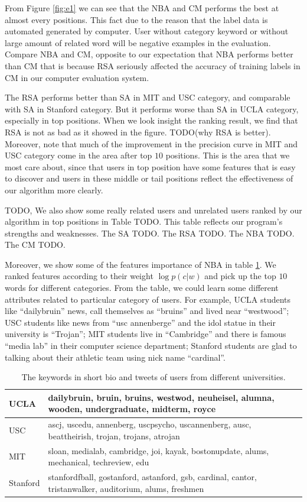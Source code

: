 \documentclass{article}
\begin{document}
From Figure \ref{fig:e1} we can see that the NBA and CM performs the best at almost every positions. This fact due to the reason that the label data is automated generated by computer. User without category keyword or without large amount of related word will be negative examples in the evaluation. Compare NBA and CM, opposite to our expectation that NBA performs better than CM that is because RSA seriously affected the accuracy of training labels in CM in our computer evaluation system.

The RSA performs better than SA in MIT and USC category, and comparable with SA in Stanford category. But it performs worse than SA in UCLA category, especially in top positions. When we look insight the ranking result, we find that RSA is not as bad as it showed in the figure. TODO(why RSA is better). Moreover, note that much of the improvement in the precision curve in MIT and USC category come in the area after top $10$ positions. This is the area that we most care about, since that users in top position have some features that is easy to discover and users in these middle or tail positions reflect the effectiveness of our algorithm more clearly.

TODO, We also show some really related users and unrelated users ranked by our algorithm in top positions in Table TODO. This table reflects our program's strengths and weaknesses. The SA TODO. The RSA TODO. The NBA TODO. The CM TODO.

Moreover, we show some of the features importance of NBA in table \ref{tab:keyword}. We ranked features according to their weight $\log p(c|w)$ and pick up the top $10$ words for different categories. From the table, we could learn some different attributes related to particular category of users. For example, UCLA students like ``dailybruin'' news, call themselves as ``bruins'' and lived near ``westwood''; USC students like news from ``usc annenberge'' and the idol statue in their university is ``Trojan''; MIT students live in ``Cambridge'' and there is famous ``media lab'' in their computer science department; Stanford students are glad to talking about their athletic team using nick name ``cardinal''.

\begin{table}[h]
\centering
\begin{tabular}{|l|l|}
\hline
UCLA & dailybruin, bruin, bruins, westwod, neuheisel, alumna, wooden, undergraduate, midterm, royce \\
\hline
USC & ascj, uscedu, annenberg, uscpsycho, uscannenberg, ausc, beattheirish, trojan, trojans, atrojan \\
\hline
MIT & sloan, medialab, cambridge, joi, kayak, bostonupdate, alums, mechanical, techreview, edu \\
\hline
Stanford & stanfordfball, gostanford, astanford, gsb, cardinal, cantor, tristanwalker, auditorium, alums, freshmen \\
\hline
\end{tabular}
\caption{The keywords in short bio and tweets of users from different universities.}\label{tab:keyword}
\end{table}
\end{document}
